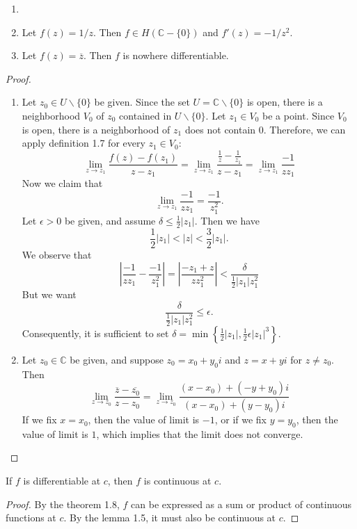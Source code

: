 \documentclass{article}
\begin{document}
\begin{multicols}{2}
\begin{exersise}
[Lemma 1.7]
\begin{enumerate}[label={(\alph*)}]
\item[]
\item Let $f(z)=1/z$. Then $f\in H(\mathbb{C}-\{0\})$ and $f'(z)=-1/z^2$.
\item Let $f(z)=\overline{z}$. Then $f$ is nowhere differentiable.
\end{enumerate}
\end{exersise}
\begin{proof}
\begin{enumerate}[label={(\alph*)}]
\item Let $z_0\in U\backslash \{0\}$ be given. Since the set $U=\mathbb{C}\backslash \{0\}$ is open, there is a neighborhood $V_0$ of $z_0$ contained in $U\backslash \{0\}$. Let $z_1\in V_0$ be a point. Since $V_0$ is open, there is a neighborhood of $z_1$ does not contain $0$. Therefore, we can apply definition 1.7 for every $z_1\in V_0$:
$$\lim_{z\to z_1}\frac{f(z)-f(z_1)}{z-z_1}=\lim_{z\to z_1}\frac{\frac{1}{z}-\frac{1}{z_1}}{z-z_1}=\lim_{z\to z_1}\frac{-1}{zz_1}$$
Now we claim that
$$\lim_{z\to z_1}\frac{-1}{zz_1}=\frac{-1}{z_1^2}.$$
Let $\epsilon>0$ be given, and assume $\delta \leq \frac{1}{2}|z_1|$. Then we have
$$\frac{1}{2}|z_1|<|z|<\frac{3}{2}|z_1|.$$
We observe that
$$\left|\frac{-1}{zz_1}-\frac{-1}{z_1^2}\right|=\left|\frac{-z_1+z}{zz_1^2}\right|<\frac{\delta}{\frac{1}{2}|z_1|z_1^2}$$
But we want
$$\frac{\delta}{\frac{1}{2}|z_1|z_1^2} \leq \epsilon.$$
Consequently, it is sufficient to set $\displaystyle \delta=\min\left\{\frac{1}{2}|z_1|, \frac{1}{2}\epsilon|z_1|^3\right\}$.
\item Let $z_0\in \mathbb{C}$ be given, and suppose $z_0=x_0+y_0i$ and $z=x+yi$ for $z\neq z_0$. Then 
$$\lim_{z\to z_0} \frac{\overline{z}-\overline{z_0}}{z-z_0}
=\lim_{z\to z_0} \frac{(x-x_0)+(-y+y_0)i}{(x-x_0)+(y-y_0)i}
$$
If we fix $x=x_0$, then the value of limit is $-1$, or if we fix $y=y_0$, then the value of limit is $1$, which implies that the limit does not converge.
\end{enumerate}
\end{proof}

\begin{exersise}
[Corollary 1.9]
If $f$ is differentiable at $c$, then $f$ is continuous at $c$.
\end{exersise}
\begin{proof}
By the theorem 1.8, $f$ can be expressed as a sum or product of continuous functions at $c$.
By the lemma 1.5, it must also be continuous at $c$.
\end{proof}


\end{multicols}
\end{document}
